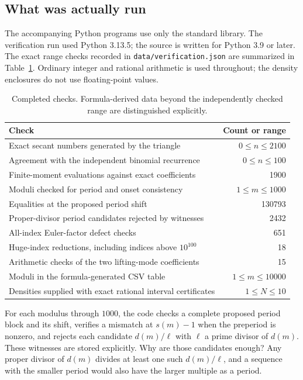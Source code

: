 \documentclass[11pt,a4paper]{article}
\numberwithin{equation}{section}
\theoremstyle{definition}
\begin{document}
\subsection{What was actually run}

The accompanying Python programs use only the standard library. The
verification run used Python 3.13.5; the source is written for Python 3.9
or later. The exact range checks recorded in
\texttt{data/verification.json} are summarized in
Table~\ref{tab:verification}. Ordinary integer and rational arithmetic is used
throughout; the density enclosures do not use floating-point values.

\begin{table}[htbp]
\centering
\caption{Completed checks. Formula-derived data beyond the independently
checked range are distinguished explicitly.}
\label{tab:verification}
\begin{tabular}{@{}p{}r@{}}
\toprule
Check & Count or range\\
\midrule
Exact secant numbers generated by the triangle & $0\le n\le2100$\\
Agreement with the independent binomial recurrence & $0\le n\le100$\\
Finite-moment evaluations against exact coefficients & 1900\\
Moduli checked for period and onset consistency & $1\le m\le1000$\\
Equalities at the proposed period shift & 130793\\
Proper-divisor period candidates rejected by witnesses & 2432\\
All-index Euler-factor defect checks & 651\\
Huge-index reductions, including indices above $10^{100}$ & 18\\
Arithmetic checks of the two lifting-mode coefficients & 15\\
Moduli in the formula-generated CSV table & $1\le m\le10000$\\
Densities supplied with exact rational interval certificates & $1\le N\le10$\\
\bottomrule
\end{tabular}
\end{table}

For each modulus through $1000$, the code checks a complete proposed
period block and its shift, verifies a mismatch at $s(m)-1$ when the
preperiod is nonzero, and rejects each candidate $d(m)/\ell$ with $\ell$
a prime divisor of $d(m)$. These witnesses are stored explicitly.
Why are those candidates enough? Any proper divisor of $d(m)$ divides
at least one such $d(m)/\ell$, and a sequence with the smaller period
would also have the larger multiple as a period.
\end{document}
